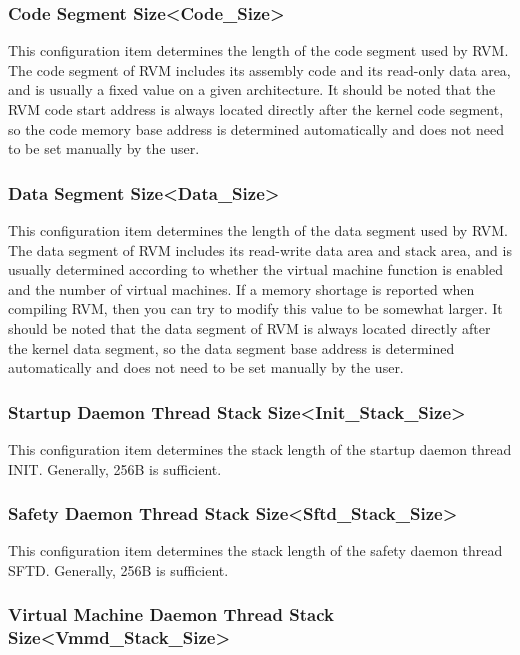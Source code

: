 \subsubsection{Code Segment Size<Code\_Size>{}}\label{subsubsec:5-3-13-1}

This configuration item determines the length of the code segment used by RVM. The code segment of RVM includes its assembly code and its read-only data area, and is usually a fixed value on a given architecture. It should be noted that the RVM code start address is always located directly after the kernel code segment, so the code memory base address is determined automatically and does not need to be set manually by the user.

\subsubsection{Data Segment Size<Data\_Size>{}}\label{subsubsec:5-3-13-2}

This configuration item determines the length of the data segment used by RVM. The data segment of RVM includes its read-write data area and stack area, and is usually determined according to whether the virtual machine function is enabled and the number of virtual machines. If a memory shortage is reported when compiling RVM, then you can try to modify this value to be somewhat larger. It should be noted that the data segment of RVM is always located directly after the kernel data segment, so the data segment base address is determined automatically and does not need to be set manually by the user.

\subsubsection{Startup Daemon Thread Stack Size<Init\_Stack\_Size>{}}\label{subsubsec:5-3-13-3}

This configuration item determines the stack length of the startup daemon thread INIT. Generally, 256B is sufficient.

\subsubsection{Safety Daemon Thread Stack Size<Sftd\_Stack\_Size>{}}\label{subsubsec:5-3-13-4}

This configuration item determines the stack length of the safety daemon thread SFTD. Generally, 256B is sufficient.

\subsubsection{Virtual Machine Daemon Thread Stack Size<Vmmd\_Stack\_Size>{}}\label{subsubsec:5-3-13-5}

